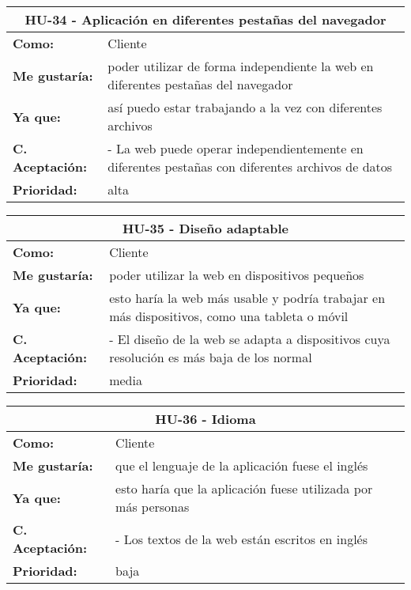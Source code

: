 \begin{table}[H]
	\begin{tabular}{| p{3cm}| p{12cm} |}
		\hline
		\multicolumn{2}{|c|}{\textbf{HU-34} - Aplicación en diferentes pestañas del navegador} \\ \hline
		\textbf{Como:} & Cliente \\ \hline
		\textbf{Me gustaría:} & poder utilizar de forma independiente la web en diferentes pestañas del navegador \\ \hline
		\textbf{Ya que:} & así puedo estar trabajando a la vez con diferentes archivos \\ \hline
		\textbf{C. Aceptación:} & - La web puede operar independientemente en diferentes pestañas con diferentes archivos de datos \\ \hline
		\textbf{\textbf{Prioridad:}} & alta \\ \hline
	\end{tabular}
\end{table}


\begin{table}[H]
	\begin{tabular}{| p{3cm}| p{12cm} |}
		\hline
		\multicolumn{2}{|c|}{\textbf{HU-35} - Diseño adaptable} \\ \hline
		\textbf{Como:} & Cliente \\ \hline
		\textbf{Me gustaría:} & poder utilizar la web en dispositivos pequeños \\ \hline
		\textbf{Ya que:} & esto haría la web más usable y podría trabajar en más dispositivos, como una tableta o móvil \\ \hline
		\textbf{C. Aceptación:} & - El diseño de la web se adapta a dispositivos cuya resolución es más baja de los normal \\ \hline
		\textbf{\textbf{Prioridad:}} & media \\ \hline
	\end{tabular}
\end{table}


\begin{table}[H]
	\begin{tabular}{| p{3cm}| p{12cm} |}
		\hline
		\multicolumn{2}{|c|}{\textbf{HU-36} - Idioma} \\ \hline
		\textbf{Como:} & Cliente \\ \hline
		\textbf{Me gustaría:} & que el lenguaje de la aplicación fuese el inglés \\ \hline
		\textbf{Ya que:} & esto haría que la aplicación fuese utilizada por más personas \\ \hline
		\textbf{C. Aceptación:} & - Los textos de la web están escritos en inglés \\ \hline
		\textbf{\textbf{Prioridad:}} & baja \\ \hline
	\end{tabular}
\end{table}

